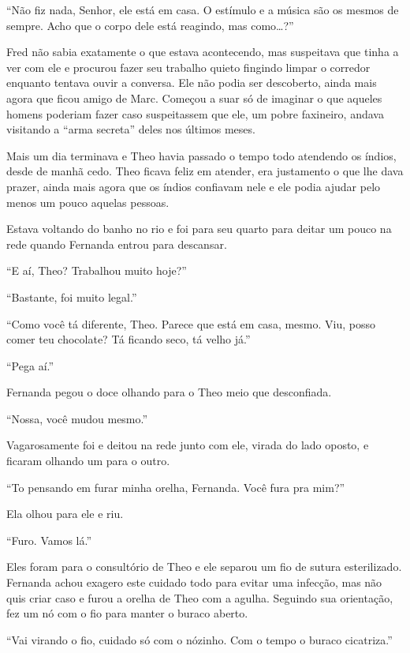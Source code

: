 ``Não fiz nada, Senhor, ele está em casa. O estímulo e a música são os
mesmos de sempre. Acho que o corpo dele está reagindo, mas
como\ldots{}?''

Fred não sabia exatamente o que estava acontecendo, mas suspeitava que
tinha a ver com ele e procurou fazer seu trabalho quieto fingindo limpar
o corredor enquanto tentava ouvir a conversa. Ele não podia ser
descoberto, ainda mais agora que ficou amigo de Marc. Começou a suar só
de imaginar o que aqueles homens poderiam fazer caso suspeitassem que
ele, um pobre faxineiro, andava visitando a ``arma secreta'' deles nos
últimos meses.

\asterisc


Mais um dia terminava e Theo havia passado o tempo todo atendendo os
índios, desde de manhã cedo. Theo ficava feliz em atender, era
justamento o que lhe dava prazer, ainda mais agora que os índios
confiavam nele e ele podia ajudar pelo menos um pouco aquelas pessoas.

Estava voltando do banho no rio e foi para seu quarto para deitar um
pouco na rede quando Fernanda entrou para descansar.

``E aí, Theo? Trabalhou muito hoje?''

``Bastante, foi muito legal.''

``Como você tá diferente, Theo. Parece que está em casa, mesmo. Viu,
posso comer teu chocolate? Tá ficando seco, tá velho já.''

``Pega aí.''

Fernanda pegou o doce olhando para o Theo meio que desconfiada.

``Nossa, você mudou mesmo.''

Vagarosamente foi e deitou na rede junto com ele, virada do lado oposto,
e ficaram olhando um para o outro.

``To pensando em furar minha orelha, Fernanda. Você fura pra mim?''

Ela olhou para ele e riu.

``Furo. Vamos lá.''

Eles foram para o consultório de Theo e ele separou um fio de sutura
esterilizado. Fernanda achou exagero este cuidado todo para evitar uma
infecção, mas não quis criar caso e furou a orelha de Theo com a agulha.
Seguindo sua orientação, fez um nó com o fio para manter o buraco
aberto.

``Vai virando o fio, cuidado só com o nózinho. Com o tempo o buraco
cicatriza.''

